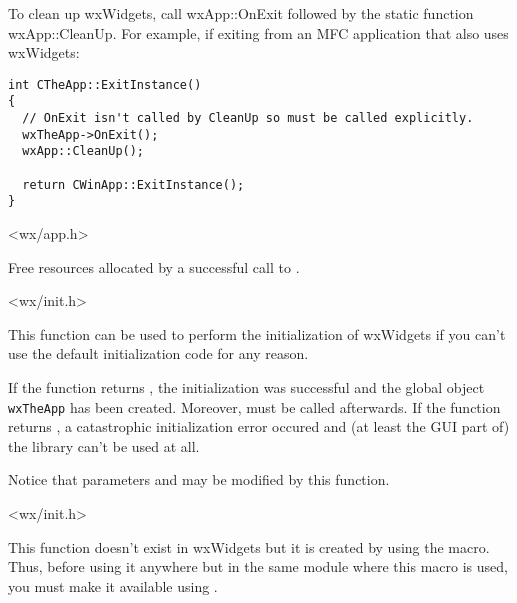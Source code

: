 
To clean up wxWidgets, call wxApp::OnExit followed by the static function
wxApp::CleanUp. For example, if exiting from an MFC application that also uses wxWidgets:

\begin{verbatim}
int CTheApp::ExitInstance()
{
  // OnExit isn't called by CleanUp so must be called explicitly.
  wxTheApp->OnExit();
  wxApp::CleanUp();

  return CWinApp::ExitInstance();
}
\end{verbatim}


<wx/app.h>



\label{wxentrycleanup}


Free resources allocated by a successful call to .


<wx/init.h>


\label{wxentrystart}


This function can be used to perform the initialization of wxWidgets if you
can't use the default initialization code for any reason.

If the function returns \true, the initialization was successful and the global 
 object \texttt{wxTheApp} has been created. Moreover, 
 must be called afterwards. If the
function returns \false, a catastrophic initialization error occured and (at
least the GUI part of) the library can't be used at all.

Notice that parameters  and  may be modified by this
function.


<wx/init.h>


\label{wxgetapp}


This function doesn't exist in wxWidgets but it is created by using
the  macro. Thus, before using it
anywhere but in the same module where this macro is used, you must make it
available using .

